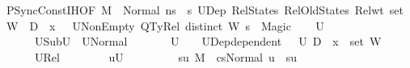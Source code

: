 \begin{isabellebody}
\ PSyncConst{\isachardot}{\kern0pt}IH{\isacharbrackleft}{\kern0pt}OF\ {\isacartoucheopen}M{\isacharcomma}{\kern0pt}{\isasymLambda}{\isacharcomma}{\kern0pt}{\isasymGamma}{\isacharcomma}{\kern0pt}{\isasymOmega}\ {\isasymturnstile}\ {\isasymlangle}{\isacharbrackleft}{\kern0pt}{\isacharbrackright}{\kern0pt}{\isacharcomma}{\kern0pt}Normal\ ns{\isasymrangle}\ {\isacharbrackleft}{\kern0pt}{\isasymrightarrow}{\isacharbrackright}{\kern0pt}\ s{\isacharprime}{\kern0pt}{\isacartoucheclose}\ U{}Dep\ RelStates\ RelOldStates\ Rel{\isacharunderscore}{\kern0pt}wt\ {\isacartoucheopen}set\ W\ {\isasyminter}\ {\isacharparenleft}{\kern0pt}D{}\ {\isasymunion}\ {\isacharbraceleft}{\kern0pt}x{}{\isacharbraceright}{\kern0pt}{\isacharparenright}{\kern0pt}\ {\isacharequal}{\kern0pt}\ {\isacharbraceleft}{\kern0pt}{\isacharbraceright}{\kern0pt}{\isacartoucheclose}\ U{}NonEmpty\ QTyRel\ {\isacartoucheopen}distinct\ W{\isacartoucheclose}\ {\isacartoucheopen}s{\isacharprime}{\kern0pt}\ {\isasymnoteq}\ Magic{\isacartoucheclose}{\isacharbrackright}{\kern0pt}\isanewline
\ \ \isamarkupfalse%
\ U{}\ \ \isanewline
\ \ \ \ \ \ U{}Sub{\isacharcolon}{\kern0pt}{\isachardoublequoteopen}U{}\ {\isasymsubseteq}\ {\isacharquery}{\kern0pt}U{}Normal{\isachardoublequoteclose}\ \isanewline
\ \ \ \ \ \ {\isachardoublequoteopen}U{}\ {\isasymnoteq}\ {\isacharbraceleft}{\kern0pt}{\isacharbraceright}{\kern0pt}{\isachardoublequoteclose}\ \ U{}Dep{\isacharcolon}{\kern0pt}{\isachardoublequoteopen}dependent\ {\isasymLambda}{\isacharprime}{\kern0pt}\ {\isasymOmega}\ U{}\ {\isacharparenleft}{\kern0pt}D{}\ {\isasymunion}\ {\isacharbraceleft}{\kern0pt}x{}{\isacharbraceright}{\kern0pt}\ {\isasymunion}\ set\ W{\isacharparenright}{\kern0pt}{\isachardoublequoteclose}\ \isanewline
\ \ \ \ \ \ U{}Rel{\isacharcolon}{\kern0pt}\isanewline
\ \ \ \ \ \ \ \ {\isachardoublequoteopen}{\isasymforall}u{\isasymin}U{}{\isachardot}{\kern0pt}\isanewline
\ \ \ \ \ \ \ \ \ {\isasymexists}su{\isachardot}{\kern0pt}\ {\isacharparenleft}{\kern0pt}M{\isacharcomma}{\kern0pt}{\isasymLambda}{\isacharprime}{\kern0pt}{\isacharcomma}{\kern0pt}{\isasymGamma}{\isacharcomma}{\kern0pt}{\isasymOmega}\ {\isasymturnstile}\ {\isasymlangle}cs{\isacharcomma}{\kern0pt}Normal\ u{\isasymrangle}\ {\isacharbrackleft}{\kern0pt}{\isasymrightarrow}{\isacharbrackright}{\kern0pt}\ su{\isacharparenright}{\kern0pt}\ {\isasymand}\isanewline

\end{isabellebody}

